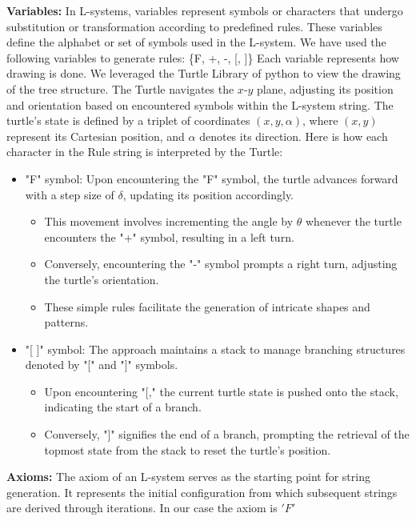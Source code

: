 \vspace*{3mm}
\noindent\textbf{Variables:}
In L-systems, variables represent symbols or characters that undergo substitution or transformation according to predefined rules. These variables define the alphabet or set of symbols used in the L-system. We have used the following variables to generate rules:
\{F, +, -, [, ]\}
Each variable represents how drawing is done. We leveraged the Turtle Library of python to view the drawing of the tree structure. The Turtle navigates the $x$-$y$ plane, adjusting its position and orientation based on encountered symbols within the L-system string. The turtle's state is defined by a triplet of coordinates $(x, y, \alpha)$, where $(x, y)$ represent its Cartesian position, and $\alpha$ denotes its direction. Here is how each character in the Rule string is interpreted by the Turtle:
\begin{itemize}
 \item "F" symbol: Upon encountering the "F" symbol, the turtle advances forward with a step size of $\delta$, updating its position accordingly. 
    \begin{itemize}
        \item This movement involves incrementing the angle by $\theta$ whenever the turtle encounters the "+" symbol, resulting in a left turn. 
        \item Conversely, encountering the "-" symbol prompts a right turn, adjusting the turtle's orientation. 
        \item These simple rules facilitate the generation of intricate shapes and patterns.
    \end{itemize}
\item "[ ]" symbol: The approach maintains a stack to manage branching structures denoted by "[" and "]" symbols. 
\begin{itemize}
\item Upon encountering "[," the current turtle state is pushed onto the stack, indicating the start of a branch. 
        \item Conversely, "]" signifies the end of a branch, prompting the retrieval of the topmost state from the stack to reset the turtle's position.
\end{itemize}
\end{itemize}

\vspace*{3mm}
\noindent\textbf{Axioms:} The axiom of an L-system serves as the starting point for string generation. It represents the initial configuration from which subsequent strings are derived through iterations. In our case the axiom is $'F'$

